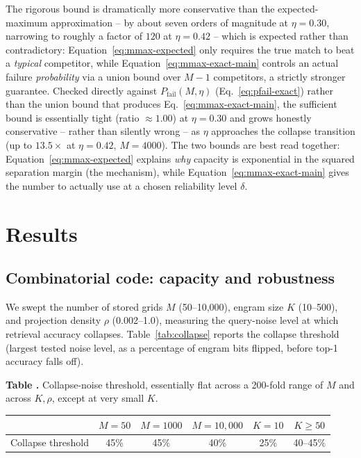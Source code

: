 \documentclass[11pt]{article}
\newcommand{\toprule}{\hline\hline}
\newcommand{\midrule}{\hline}
\newcommand{\bottomrule}{\hline\hline}
\begin{document}
The rigorous bound is dramatically more conservative than the expected-maximum approximation --
by about seven orders of magnitude at $\eta{=}0.30$, narrowing to roughly a factor of $120$ at
$\eta{=}0.42$ -- which is expected rather than contradictory: Equation~\ref{eq:mmax-expected}
only requires the true match to beat a \emph{typical} competitor, while
Equation~\ref{eq:mmax-exact-main} controls an actual failure \emph{probability} via a union
bound over $M{-}1$ competitors, a strictly stronger guarantee. Checked directly against
$P_{\mathrm{fail}}(M,\eta)$ (Eq.~\ref{eq:pfail-exact}) rather than the union bound that produces
Eq.~\ref{eq:mmax-exact-main}, the sufficient bound is essentially tight (ratio $\approx1.00$) at
$\eta{=}0.30$ and grows honestly conservative -- rather than silently wrong -- as $\eta$
approaches the collapse transition (up to $13.5\times$ at $\eta{=}0.42$, $M{=}4000$). The two
bounds are best read together: Equation~\ref{eq:mmax-expected} explains \emph{why} capacity is
exponential in the squared separation margin (the mechanism), while
Equation~\ref{eq:mmax-exact-main} gives the number to actually use at a chosen reliability
level $\delta$.

\section{Results}

\subsection{Combinatorial code: capacity and robustness}

We swept the number of stored grids $M$ (50--10{,}000), engram size $K$ (10--500), and
projection density $\rho$ (0.002--1.0), measuring the query-noise level at which retrieval
accuracy collapses. Table~\ref{tab:collapse} reports the collapse threshold (largest tested
noise level, as a percentage of engram bits flipped, before top-1 accuracy falls off).

\label{tab:collapse}
\noindent\textbf{Table \thetable.} Collapse-noise threshold, essentially flat across a 200-fold range of $M$
and across $K,\rho$, except at very small $K$.
\begin{center}
\begin{tabular}{lccccc}
\toprule
 & $M{=}50$ & $M{=}1000$ & $M{=}10{,}000$ & $K{=}10$ & $K{\geq}50$ \\
\midrule
Collapse threshold & 45\% & 45\% & 40\% & 25\% & 40--45\% \\
\bottomrule
\end{tabular}
\end{center}
\end{document}
